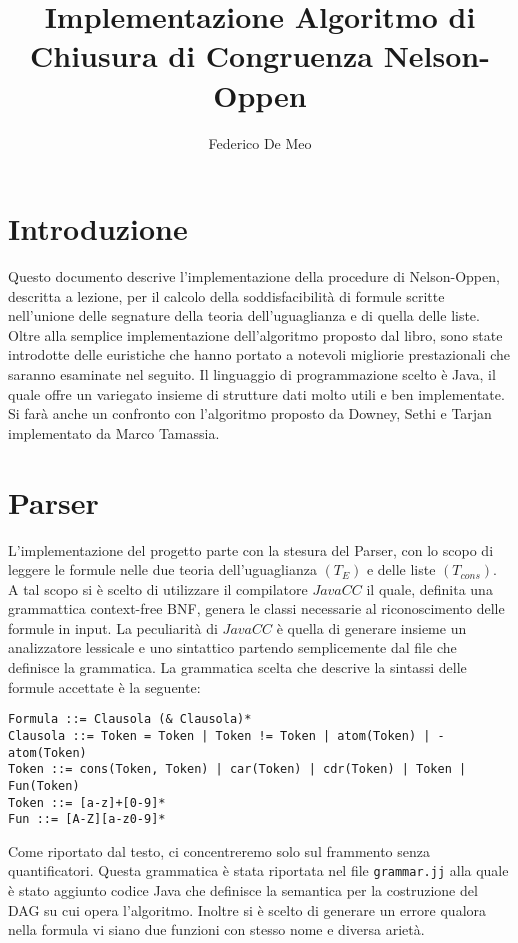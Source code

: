 \documentclass[a4paper,11pt]{article}
\title{Implementazione Algoritmo di Chiusura di Congruenza Nelson-Oppen}
\author{Federico De Meo}
\begin{document}
\maketitle

\footnotesize
\section*{Introduzione}
Questo documento descrive l'implementazione della procedure di Nelson-Oppen, descritta a lezione, per il calcolo della soddisfacibilità di formule scritte nell'unione delle segnature della teoria dell'uguaglianza e di quella delle liste. Oltre alla semplice implementazione dell'algoritmo proposto dal libro, sono state introdotte delle euristiche che hanno portato a notevoli migliorie prestazionali che saranno esaminate nel seguito.
Il linguaggio di programmazione scelto è Java, il quale offre un variegato insieme di strutture dati molto utili e ben implementate.
Si farà anche un confronto con l'algoritmo proposto da Downey, Sethi e Tarjan implementato da Marco Tamassia.

\section{Parser}
L'implementazione del progetto parte con la stesura del Parser, con lo scopo di leggere le formule nelle due teoria dell'uguaglianza $(T_E)$ e delle liste $(T_{cons})$.
A tal scopo si è scelto di utilizzare il compilatore $JavaCC$ il quale, definita una grammattica context-free BNF, genera le classi necessarie al riconoscimento delle formule in input.
La peculiarità di $JavaCC$ è quella di generare insieme un analizzatore lessicale e uno sintattico partendo semplicemente dal file che definisce la grammatica.
La grammatica scelta che descrive la sintassi delle formule accettate è la seguente:
\begin{lstlisting}
Formula ::= Clausola (& Clausola)*
Clausola ::= Token = Token | Token != Token | atom(Token) | -atom(Token)
Token ::= cons(Token, Token) | car(Token) | cdr(Token) | Token | Fun(Token)
Token ::= [a-z]+[0-9]*
Fun ::= [A-Z][a-z0-9]*
\end{lstlisting}
Come riportato dal testo, ci concentreremo solo sul frammento senza quantificatori.
Questa grammatica è stata riportata nel file {\tt grammar.jj} alla quale è stato aggiunto codice Java che definisce la semantica per la costruzione del DAG su cui opera l'algoritmo.
Inoltre si è scelto di generare un errore qualora nella formula vi siano due funzioni con stesso nome e diversa arietà.
\end{document}
